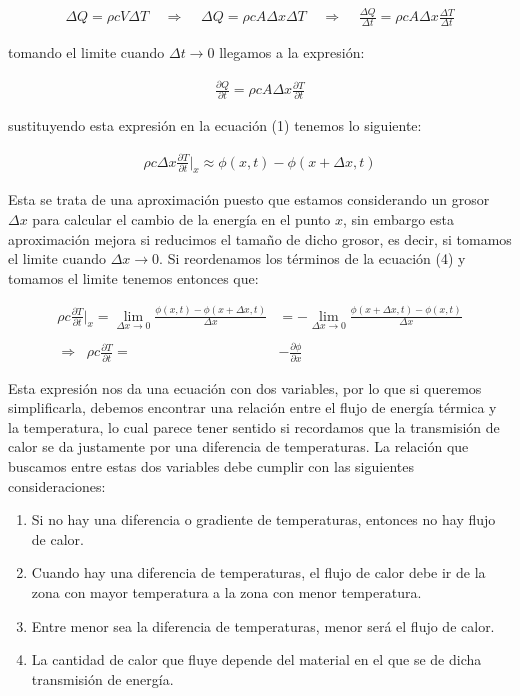 \documentclass[12pt]{article}
\begin{document}
\begin{align*}
    \Delta Q = \rho cV\Delta T \;\;\;\; \Rightarrow \;\;\;\; \Delta Q = \rho cA\Delta x\Delta T \;\;\;\; \Rightarrow \;\;\;\; \frac{\Delta Q}{\Delta t} = \rho cA\Delta x\frac{\Delta T}{\Delta t}
\end{align*}

tomando el limite cuando $\Delta t \rightarrow 0$ llegamos a la expresión:

\begin{align}
    \frac{\partial Q}{\partial t} = \rho cA\Delta x\frac{\partial T}{\partial t}
\end{align}

sustituyendo esta expresión en la ecuación (1) tenemos lo siguiente:

\begin{align}
    \rho c\Delta x\frac{\partial T}{\partial t}\Big|_x  \approx \phi(x,t) - \phi(x+\Delta x,t)
\end{align}

Esta se trata de una aproximación puesto que estamos considerando un grosor $\Delta x$ para calcular el cambio de la energía en el punto $x$, sin embargo esta aproximación mejora si reducimos el tamaño de dicho grosor, es decir, si tomamos el limite cuando $\Delta x \rightarrow 0$. Si reordenamos los términos de la ecuación (4) y tomamos el limite tenemos entonces que:

\begin{align}
    \nonumber \rho c\frac{\partial T}{\partial t}\Big|_x  = \lim_{\Delta x \to 0} \frac{\phi(x,t) - \phi(x+\Delta x,t)}{\Delta x}& = -\lim_{\Delta x \to 0} \frac{\phi(x+\Delta x,t)-\phi(x,t)}{\Delta x} \\
    \nonumber \\
    \Rightarrow \;\;\rho c\frac{\partial T}{\partial t} = &-\frac{\partial \phi}{\partial x}
\end{align}

Esta expresión nos da una ecuación con dos variables, por lo que si queremos simplificarla, debemos encontrar una relación entre el flujo de energía térmica y la temperatura, lo cual parece tener sentido si recordamos que la transmisión de calor se da justamente por una diferencia de temperaturas. La relación que buscamos entre estas dos variables debe cumplir con las siguientes consideraciones: \\

\begin{enumerate}
    \item Si no hay una diferencia o gradiente de temperaturas, entonces no hay flujo de calor.
    \item Cuando hay una diferencia de temperaturas, el flujo de calor debe ir de la zona con mayor temperatura a la zona con menor temperatura.
    \item Entre menor sea la diferencia de temperaturas, menor será el flujo de calor.
    \item La cantidad de calor que fluye depende del material en el que se de dicha transmisión de energía.
\end{enumerate}
\end{document}
